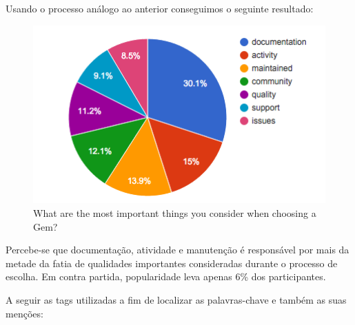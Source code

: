 Usando o processo análogo ao anterior conseguimos o seguinte resultado:

\begin{figure}[H]
  \centering
  \includegraphics[width=15cm]{Imagens/qualities.png}
  \caption{What are the most important things you consider when choosing a Gem?}
\end{figure}

Percebe-se que documentação, atividade e manutenção é responsável por mais da metade da fatia de qualidades importantes consideradas durante o processo de escolha. Em contra partida, popularidade leva apenas 6\% dos participantes.

\newpage

A seguir as tags utilizadas a fim de localizar as palavras-chave e também as suas menções:


